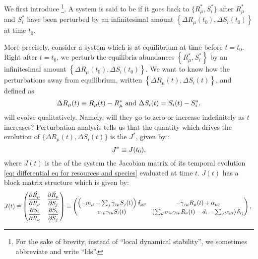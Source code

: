 \documentclass[12pt, titlepage]{report}
\begin{document}
We first introduce \footnote{For the sake of brevity, instead of ``local dynamical stability'', we sometimes abbreviate and write ``lds''.}. A system is said to be  if it goes back to  $\{ R^*_\mu, S^*_i \} $ after $R^*_\mu$ and $S^*_i$ have been perturbed by an infinitesimal amount $\left\{ \Delta R_\mu(t_0), \Delta S_i(t_0) \right\}$ at time $t_0$.

More precisely, consider a system which is at equilibrium at time before $t=t_0$. Right after $t=t_0$, we perturb the equilibria abundances $\left\{R_\mu^*, S_i^*\right\}$ by an infinitesimal amount $\left\{ \Delta R_\mu(t_0), \Delta S_i(t_0) \right\}$.
We want to know how the perturbations away from equilibrium, written $\left\{ \Delta R_\mu(t), \Delta S_i(t) \right\}$, and defined as
\begin{equation}
\Delta R_\mu(t)\equiv R_\mu(t)-R_\mu^* \text{ and } \Delta S_i(t) = S_i(t)-S_i^*.
\end{equation}
will evolve qualitatively. Namely, will they go to zero or increase indefinitely as $t$ increases? Perturbation analysis tells us \cite{strogatz_nonlinear_1994} that the quantity which drives the evolution of $\{ \Delta R_\mu(t), \Delta S_i(t)\}$
is the  $J^*$, given by :
\begin{equation}
J^* \equiv J(t_0),
\end{equation}
where $J(t)$ is the  of the system \ie the Jacobian matrix of its temporal evolution \eqref{eq: differential eq for resources and species} evaluated at time $t$. $J(t)$ has a block matrix structure which is given by:
\begin{equation}
  J(t) \defined
\begin{pmatrix}
  \partiald{\dot{R_\mu}}{R_\nu}& \partiald{\dot{R_\mu}}{S_j} \\
  \partiald{\dot{S_i}}{R_\nu} & \partiald{\dot{S_i}}{S_j}
\end{pmatrix}
=
\begin{pmatrix}
  \left(-m_\mu-\sum_j \gamma_{j\mu}S_j(t)\right)\delta_{\mu\nu} & -\gamma_{j\mu}R_\mu(t)+\alpha_{\mu j} \\
  \sigma_{i\nu}\gamma_{i\nu}S_i(t) &\left(\sum_{\nu} \sigma_{i\nu}\gamma_{i\nu}R_\nu(t)-d_i-\sum_\nu \alpha_{\nu i}\right)\delta_{ij}
\end{pmatrix}, \label{eq: definition of jacobian}
\end{equation}
\end{document}
